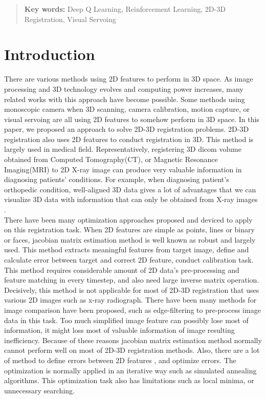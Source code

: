 \documentclass[10pt]{article}
\begin{document}
\begin{abstract}
\vspace*{5mm}
\noindent
{\bf Key words:}  Deep Q Learning, Reinforcement Learning, 2D-3D Registration, Visual Servoing
\end{abstract}

\newpage
\section{Introduction}
 There are various methods using 2D features to perform in 3D space. As image processing and 3D technology evolves and computing power increases, many related works with this approach have become possible. Some methods using monoscopic camera when 3D scanning\cite{3dscanning}, camera calibration\cite{cameracalibration}, motion capture\cite{motioncapture}, or visual servoing\cite{visualservoing} are all using 2D features to somehow perform in 3D space. In this paper, we proposed an approach to solve 2D-3D registration problems. 2D-3D registration also uses 2D features to conduct registration in 3D. This method is largely used in medical field. Representatively,  registering 3D dicom volume obtained from Computed Tomography(CT), or Magnetic Resonance Imaging(MRI) to 2D X-ray image can produce very valuable information in diagnosing patients' conditions. For example, when diagnosing patient's orthopedic condition, well-aligned 3D data gives a lot of advantages that we can visualize 3D data with information that can only be obtained from X-ray images \cite{femoral, tka}.\\
 There have been many optimization approaches proposed and deviced to apply on this registration task. When 2D features are simple as points, lines or binary or faces, jacobian matrix estimation\cite{jacobianmatrix} method is well known as robust and largely used. This method extracts meaningful features from target image, define and calculate error between target and correct 2D feature, conduct calibration task. This method requires considerable amount of 2D data's pre-processing and feature matching in every timestep, and also need large inverse matrix operation. Decisively, this method is not applicable for most of 2D-3D registration that uses various 2D images such as x-ray radiograph.  There have been many methods for image comparison have been proposed, such as edge-filtering\cite{edge} to pre-process image data in this task. Too much simplified image feature can possibly lose most of information, it might loss most of valuable information of image resulting inefficiency. Because of these reasons jacobian matrix estimation method normally cannot perform well on most of 2D-3D registration methods. Also, there are a lot of method to define errors between 2D features \cite{validation}, and optimize errors. The optimization is normally applied in an iterative way such as simulated annealing algorithms\cite{edge}. This optimization task also has limitations such as local minima, or unnecessary searching.\\
\end{document}
